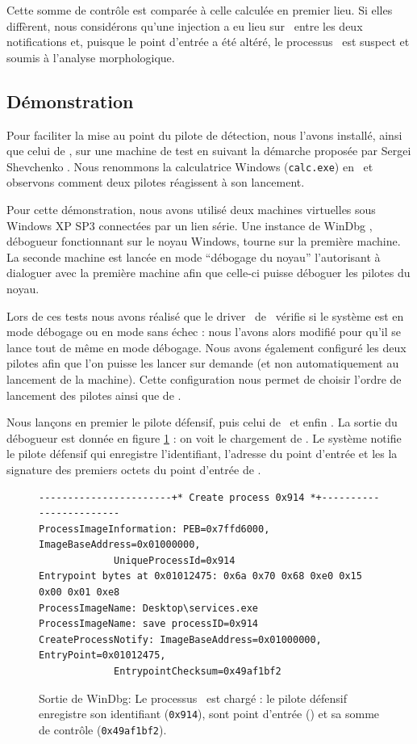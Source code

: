 Cette somme de contrôle est comparée à celle calculée en premier lieu.
Si elles diffèrent, nous considérons qu'une injection a eu lieu sur \services\ entre les deux notifications et, puisque le point d'entrée a été altéré, le processus \services\ est suspect et soumis à l'analyse morphologique.


\subsection{Démonstration}
Pour faciliter la mise au point du pilote de détection, nous l'avons installé, ainsi que celui de \duqu, sur une machine de test en suivant la démarche proposée par Sergei Shevchenko \cite{SShevchenko}.
Nous renommons la calculatrice Windows (\texttt{calc.exe}) en \services\ et observons comment deux pilotes réagissent à son lancement.

Pour cette démonstration, nous avons utilisé deux machines virtuelles sous Windows XP SP3 connectées par un lien série.
Une instance de WinDbg \cite{WinDBG}, débogueur fonctionnant sur le noyau Windows, tourne sur la première machine.
La seconde machine est lancée en mode ``débogage du noyau'' l'autorisant à dialoguer avec la première machine afin que celle-ci puisse déboguer les pilotes du noyau.

Lors de ces tests nous avons réalisé que le driver \driver\ de \duqu\ vérifie si le système est en mode débogage ou en mode sans échec : nous l'avons alors modifié pour qu'il se lance tout de même en mode débogage.
Nous avons également configuré les deux pilotes afin que l'on puisse les lancer sur demande (et non automatiquement au lancement de la machine).
Cette configuration nous permet de choisir l'ordre de lancement des pilotes ainsi que de \services.

Nous lançons en premier le pilote défensif, puis celui de \duqu\ et enfin \services.
La sortie du débogueur est donnée en figure \ref{fig:Breakpoint1} : on voit le chargement de \services.
Le système notifie le pilote défensif qui enregistre l'identifiant, l'adresse du point d'entrée et les la signature des premiers octets du point d'entrée de \services.

\begin{figure}[h]
\begin{center}
\scriptsize
\begin{lstlisting}[language={}]
-----------------------+* Create process 0x914 *+------------------------
ProcessImageInformation: PEB=0x7ffd6000, ImageBaseAddress=0x01000000,
			 UniqueProcessId=0x914 
Entrypoint bytes at 0x01012475: 0x6a 0x70 0x68 0xe0 0x15 0x00 0x01 0xe8
ProcessImageName: Desktop\services.exe
ProcessImageName: save processID=0x914
CreateProcessNotify: ImageBaseAddress=0x01000000, EntryPoint=0x01012475,
		     EntrypointChecksum=0x49af1bf2
\end{lstlisting}
\end{center}
\caption{Sortie de WinDbg: Le processus \services\ est chargé : le pilote défensif enregistre son identifiant (\texttt{0x914}), sont point d'entrée () et sa somme de contrôle (\texttt{0x49af1bf2}).\label{fig:Breakpoint1}}
\end{figure}

